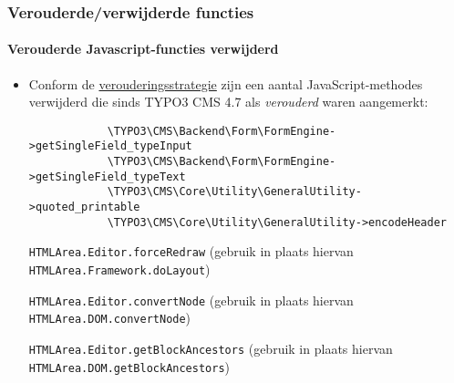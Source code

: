 \begin{frame}[fragile]
	\frametitle{Verouderde/verwijderde functies}
	\framesubtitle{Verouderde Javascript-functies verwijderd}

	\begin{itemize}
		\item Conform de \href{http://forge.typo3.org/projects/typo3v4-core/wiki/CoreDevPolicy}{verouderingsstrategie}
			zijn een aantal JavaScript-methodes verwijderd die sinds TYPO3 CMS 4.7 als \textit{verouderd} waren aangemerkt:

		\begin{lstlisting}
			\TYPO3\CMS\Backend\Form\FormEngine->getSingleField_typeInput
			\TYPO3\CMS\Backend\Form\FormEngine->getSingleField_typeText
			\TYPO3\CMS\Core\Utility\GeneralUtility->quoted_printable
			\TYPO3\CMS\Core\Utility\GeneralUtility->encodeHeader
		\end{lstlisting}

		\smaller
			\texttt{HTMLArea.Editor.forceRedraw}\newline
				(gebruik in plaats hiervan \texttt{HTMLArea.Framework.doLayout})
				\vspace{0.2cm}

			\texttt{HTMLArea.Editor.convertNode}\newline
				(gebruik in plaats hiervan \texttt{HTMLArea.DOM.convertNode})
				\vspace{0.2cm}

			\texttt{HTMLArea.Editor.getBlockAncestors}\newline
				(gebruik in plaats hiervan \texttt{HTMLArea.DOM.getBlockAncestors})
		\normalsize

	\end{itemize}

\end{frame}


